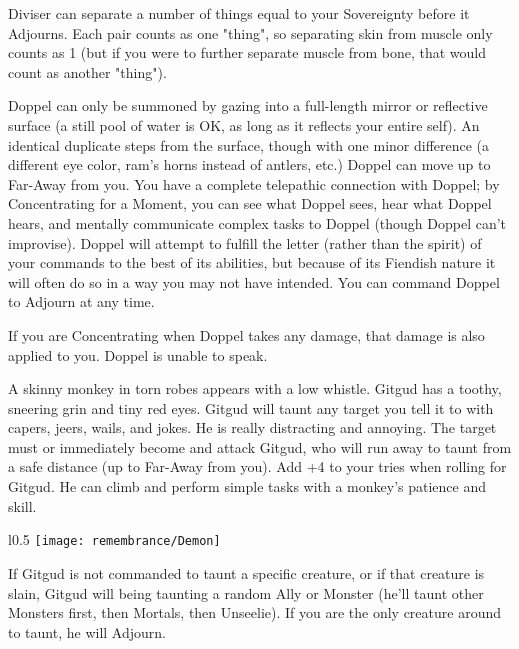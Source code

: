 Diviser{\AccentE} can separate a number of things equal to your Sovereignty before it Adjourns. Each pair counts as one "thing", so separating skin from muscle only counts as 1 (but if you were to further separate muscle from bone, that would count as another "thing").



Doppel can only be summoned by gazing into a full-length mirror or reflective surface (a still pool of water is OK, as long as it reflects your entire self). An identical duplicate steps from the surface, though with one minor difference (a different eye color, ram's horns instead of antlers, etc.) Doppel can move up to Far-Away from you. You have a complete telepathic connection with Doppel; by Concentrating for a Moment, you can see what Doppel sees, hear what Doppel hears, and mentally communicate complex tasks to Doppel (though Doppel can't improvise). Doppel will attempt to fulfill the letter (rather than the spirit) of your commands to the best of its abilities, but because of its Fiendish nature it will often do so in a way you may not have intended. You can command Doppel to Adjourn at any time. 

If you are Concentrating when Doppel takes any damage, that damage is also applied to you.  Doppel is unable to speak.



A skinny monkey in torn robes appears with a low whistle.  Gitgud has a toothy, sneering grin and tiny red eyes.  Gitgud will taunt any target you tell it to with capers, jeers, wails, and jokes.  He is really distracting and annoying.  The target must  or immediately become  and attack Gitgud, who will run away to taunt from a safe distance (up to Far-Away from you). Add +4 to your  tries when rolling for Gitgud. He can climb and perform simple tasks with a monkey's patience and skill.

\begin{wrapfigure}[26]{l}{0.5\textwidth}
    \texttt{[image: remembrance/Demon]}
\end{wrapfigure}


If Gitgud is not commanded to taunt a specific creature, or if that creature is slain, Gitgud will being taunting a random Ally or Monster (he'll taunt other Monsters first, then Mortals, then Unseelie). If you are the only creature around to taunt, he will Adjourn.

